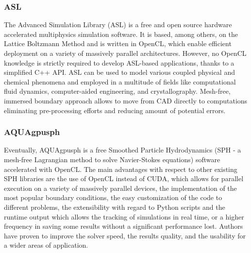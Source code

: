 \subsubsection{ASL}
  The Advanced Simulation Library (ASL) \cite{asl} is a free and open
  source hardware accelerated multiphysics simulation software. It is
  based, among others, on the Lattice Boltzmann Method and is written
  in OpenCL, which enable efficient deployment on a variety of
  massively parallel architectures. However, no OpenCL knowledge is
  strictly required to develop ASL-based applications, thanks to a
  simplified C++ API. ASL can be used to model various coupled
  physical and chemical phenomena and employed in a multitude of
  fields like computational fluid dynamics, computer-aided
  engineering, and crystallography.  Mesh-free, immersed boundary
  approach allows to move from CAD directly to computations
  eliminating pre-processing efforts and reducing amount of potential
  errors.
\subsubsection{AQUAgpusph}
  Eventually, AQUAgpusph \cite{CercosPita2015295} is a free Smoothed
  Particle Hydrodynamics (SPH - a mesh-free Lagrangian method to solve
  Navier-Stokes equations) software accelerated with OpenCL. The main
  advantages with respect to other existing SPH libraries are the use
  of OpenCL instead of CUDA, which allows for parallel execution on a
  variety of massively parallel devices, the implementation of the
  most popular boundary conditions, the easy customization of the code
  to different problems, the extensibility with regard to Python
  scripts and the runtime output which allows the tracking of
  simulations in real time, or a higher frequency in saving some
  results without a significant performance lost. Authors have proven
  to improve the solver speed, the results quality, and the usability
  for a wider areas of application.
  
